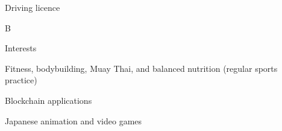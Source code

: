 \documentclass[a4paper,10pt]{article}
\newlength{\cvcolumngapwidth}
\newlength{\cvleftcolumnwidth}
\newlength{\cvrightcolumnwidth}
\newcommand{\cvheadingstyle}[1]{{\normalsize\cvheadingfont\textcolor{cvheadingcolor}{#1}}}
\newlength{\cvafteritemskipamount}
\newlength{\cvparskip}
\newcommand{\cvitem}[2]{
    \begin{minipage}[t]{\cvleftcolumnwidth}
        \raggedleft #1
    \end{minipage}%
    \hspace{\cvcolumngapwidth}%
    \begin{minipage}[t]{\cvrightcolumnwidth}
        \setlength{\parskip}{\cvparskip} #2
    \end{minipage}

    \vspace{\cvafteritemskipamount}
}
\begin{document}
\cvitem{
    \cvheadingstyle{Driving licence}
}{
    B
}

\cvitem{
    \cvheadingstyle{Interests}
}{
    Fitness, bodybuilding, Muay Thai, and balanced nutrition (regular sports practice) \par
    Blockchain applications \par
    Japanese animation and video games \par
}

\end{document}
